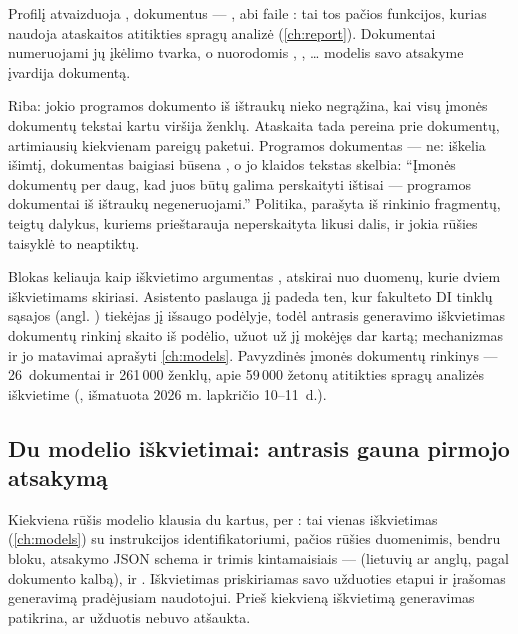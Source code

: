 Profilį atvaizduoja , dokumentus --- ,
abi faile : tai tos pačios funkcijos, kurias naudoja ataskaitos
atitikties spragų analizė (\cref{ch:report}). Dokumentai numeruojami jų įkėlimo tvarka, o
nuorodomis , , … modelis savo atsakyme įvardija dokumentą.

\begin{codebox}{Riba: jokio programos dokumento iš ištraukų}
 nieko negrąžina, kai visų įmonės dokumentų tekstai kartu viršija
 ženklų. Ataskaita tada pereina prie dokumentų, artimiausių
kiekvienam pareigų paketui. Programos dokumentas --- ne:  iškelia išimtį,
dokumentas baigiasi būsena , o jo klaidos tekstas skelbia: \enquote{Įmonės
dokumentų per daug, kad juos būtų galima perskaityti ištisai --- programos dokumentai iš
ištraukų negeneruojami.} Politika, parašyta iš rinkinio fragmentų, teigtų dalykus, kuriems
prieštarauja neperskaityta likusi dalis, ir jokia rūšies taisyklė to neaptiktų.
\end{codebox}

Blokas keliauja kaip iškvietimo argumentas , atskirai nuo duomenų, kurie dviem
iškvietimams skiriasi. Asistento paslauga jį padeda ten, kur fakulteto DI tinklų sąsajos
(angl. ) tiekėjas jį išsaugo podėlyje, todėl antrasis generavimo iškvietimas
dokumentų rinkinį skaito iš podėlio, užuot už jį mokėjęs dar kartą; mechanizmas ir jo
matavimai aprašyti \cref{ch:models}. Pavyzdinės įmonės \demo{} dokumentų rinkinys --- 26~dokumentai
ir 261\,000 ženklų, apie 59\,000 žetonų atitikties spragų analizės iškvietime
(, išmatuota 2026 m. lapkričio 10--11~d.).

\subsection{Du modelio iškvietimai: antrasis gauna pirmojo atsakymą}

Kiekviena rūšis modelio klausia du kartus, per : tai vienas 
iškvietimas (\cref{ch:models}) su instrukcijos identifikatoriumi, pačios rūšies duomenimis,
bendru bloku, atsakymo JSON schema ir trimis kintamaisiais ---  (lietuvių ar
anglų, pagal dokumento kalbą),  ir . Iškvietimas priskiriamas
savo užduoties etapui ir įrašomas generavimą pradėjusiam naudotojui. Prieš kiekvieną
iškvietimą generavimas patikrina, ar užduotis nebuvo atšaukta.

